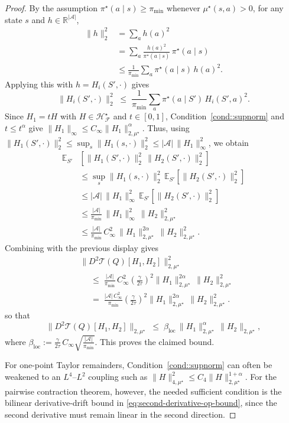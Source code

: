 \documentclass{article}
\newcommand{\loc}{\mathrm{loc}}
\theoremstyle{plain}
\theoremstyle{definition}
\theoremstyle{remark}
\newcommand{\E}{\mathbb{E}}
\begin{document}
\begin{proof}
By the assumption $\pi^\star(a\mid s)\ge\pi_{\min}$ whenever $\mu^\star(s,a)>0$,
for any state $s$ and $h\in\mathbb{R}^{|\mathcal A|}$,
\begin{align*}
\|h\|_2^2
&= \sum_a h(a)^2
\\
&= \sum_a \frac{h(a)^2}{\pi^\star(a\mid s)}\,\pi^\star(a\mid s)
\\
&\le \frac{1}{\pi_{\min}}
   \sum_a \pi^\star(a\mid s)\,h(a)^2.
\end{align*}
Applying this with $h = H_i(S',\cdot)$ gives
\[
\|H_i(S',\cdot)\|_2^2
\;\le\;
\frac{1}{\pi_{\min}}
\sum_a \pi^\star(a\mid S')\,H_i(S',a)^2.
\]
Since \(H_1=tH\) with \(H\in\mathcal H_{\mathcal F}^\star\) and \(t\in[0,1]\),
Condition~\ref{cond::supnorm} and \(t\le t^\alpha\) give
\(\|H_1\|_{\infty}\le
C_\infty\|H_1\|_{2,\mu^\star}^{\alpha}\). Thus, using
$\|H_1(S',\cdot)\|_2^2 \le \sup_{s}\|H_1(s,\cdot)\|_2^2 \le
|\mathcal{A}|\,\|H_1\|_{\infty}^2$, we obtain
\begin{align*}
 \E_{S'}&\!\left[
  \|H_1(S',\cdot)\|_2^2\,\|H_2(S',\cdot)\|_2^2
\right]\\
&\le
\sup_{s}\|H_1(s,\cdot)\|_2^2\,
\E_{S'}\!\left[\|H_2(S',\cdot)\|_2^2\right]
\\[0.4em]
&\le
|\mathcal{A}|\,
\|H_1\|_{\infty}^2\,
\E_{S'}\!\left[\|H_2(S',\cdot)\|_2^2\right]
\\[0.4em]
&\le
\frac{|\mathcal{A}|}{\pi_{\min}}\,
\|H_1\|_{\infty}^2\,
\|H_2\|_{2,\mu^\star}^2
\\[0.4em]
&\le
\frac{|\mathcal{A}|}{\pi_{\min}}\,
C_{\infty}^2\,
\|H_1\|_{2,\mu^\star}^{2\alpha}\,
\|H_2\|_{2,\mu^\star}^2.
\end{align*}
Combining with the previous display gives
\begin{align*}
& \bigl\|D^2\mathcal{T}(Q)[H_1,H_2]\bigr\|_{2,\mu^\star}^2\\
&\quad \;\le\;
\frac{|\mathcal{A}|}{\pi_{\min}}\,
C_{\infty}^2
\left(\frac{\gamma}{2\tau}\right)^{\!2}
\|H_1\|_{2,\mu^\star}^{2\alpha}\,
\|H_2\|_{2,\mu^\star}^2
\\[-0.3em]
&\quad \;=\;
\frac{|\mathcal{A}|\,C_{\infty}^2}{\pi_{\min}}
\left(\frac{\gamma}{2\tau}\right)^{\!2}
\|H_1\|_{2,\mu^\star}^{2\alpha}\,
\|H_2\|_{2,\mu^\star}^2.
\end{align*}
so that
\[
\bigl\|D^2\mathcal{T}(Q)[H_1,H_2]\bigr\|_{2,\mu^\star}
\;\le\;
\beta_{\loc}\,
\|H_1\|_{2,\mu^\star}^{\alpha}\,
\|H_2\|_{2,\mu^\star},
\]
where
$\beta_{\loc}
:=
\frac{\gamma}{2\tau}\,
C_{\infty}\sqrt{\frac{|\mathcal{A}|}{\pi_{\min}}}$.
This proves the claimed bound.

For one-point Taylor remainders, Condition~\ref{cond::supnorm} can often be
weakened to an \(L^4\)--\(L^2\) coupling such as
\(\|H\|_{4,\mu^\star}^2 \le C_4\|H\|_{2,\mu^\star}^{1+\alpha}\). For the
pairwise contraction theorem, however, the needed sufficient condition is the
bilinear derivative-drift bound in \eqref{eq:second-derivative-op-bound}, since
the second derivative must remain linear in the second direction.
\end{proof}
\end{document}
